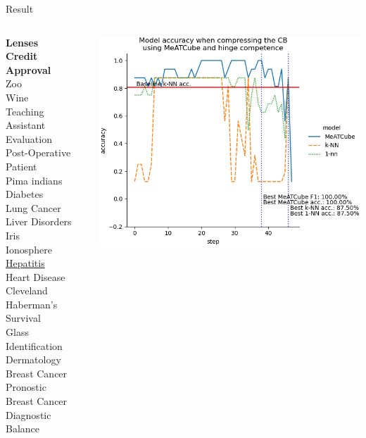 \documentclass[]{beamer}
\begin{document}
\begin{frame}{Result}
    \begin{columns}
        \begin{column}{.35\textwidth}
            {\smaller\smaller
            \textbf{Lenses} \\
            \textbf{Credit Approval} \\
            Zoo \\
            Wine \\
            Teaching Assistant Evaluation \\
            Post-Operative Patient \\
            Pima indians Diabetes \\
            Lung Cancer \\
            Liver Disorders \\
            Iris \\
            Ionosphere \\
            \underline{Hepatitis} \\
            Heart Disease Cleveland \\
            Haberman's Survival \\
            Glass Identification \\
            Dermatology \\
            Breast Cancer Pronostic \\
            Breast Cancer Diagnostic \\
            Balance\\
            ~}
        \end{column}
        \begin{column}{.65\textwidth}
            \includegraphics[width=.8\textwidth]{../results/figs/hepatitis.png}

\end{column}
\end{columns}
\end{frame}
\end{document}
